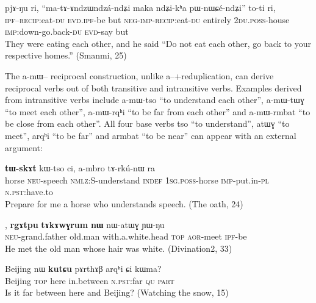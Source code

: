 \documentclass[oldfontcommands,oneside,a4paper,11pt]{memoir}
\newcommand{\ipa}[1]{{\phon #1}} %
\newcommand{\aor}{\textsc{aor}}
\newcommand{\du}{\textsc{du}}
\newcommand{\evd}{\textsc{evd}}
\newcommand{\imp}{\textsc{imp}}
\newcommand{\indef}{\textsc{indef}}
\newcommand{\ipf}{\textsc{ipf}}
\newcommand{\negat}{\textsc{neg}}
\newcommand{\neu}{\textsc{neu}}
\newcommand{\nmlz}{\textsc{nmlz}}
\newcommand{\npst}{\textsc{n.pst}}
\newcommand{\pl}{\textsc{pl}}
\newcommand{\poss}{\textsc{poss}}
\newcommand{\qu}{\textsc{qu}}
\newcommand{\recip}{\textsc{recip}}
\newcommand{\sg}{\textsc{sg}}
\newcommand{\topic}{\textsc{top}}
\begin{document}
\begin{exe}
\ex
\gll \ipa{cʰɯ-ɤndzɯndzá-ndʑi} 	\ipa{pjɤ-ŋu} 	\ipa{ri,} 	\ipa{``ma-tɤ-ɤndzɯndzá-ndʑi} \ipa{maka} \ipa{ndʑi-kʰa} \ipa{pɯ-nɯɕé-ndʑi''} 	\ipa{to-ti} 	\ipa{ri,}          \\
 \ipf{}--\recip{}:eat-\du{} \evd{}.\ipf{}-be but \negat{}-\imp{}-\recip{}:eat-\du{} entirely 2\du{}.\poss{}-house  \imp{}:down-go.back-\du{} \evd{}-say but \\
 \glt  They were eating each other, and he said ``Do not eat each other, go back to your respective homes.'' (Smanmi, 25)
\end{exe} 

 The \ipa{a-mɯ}-- reciprocal construction, unlike \ipa{a}--+reduplication, can derive reciprocal verbs out of both transitive and intransitive verbs. Examples derived from intransitive verbs include \ipa{a-mɯ-tso} ``to understand each other'',  \ipa{a-mɯ-tɯɣ} ``to meet each other'', \ipa{a-mɯ-rqʰi} ``to be far from each other'' and \ipa{a-mɯ-rmbat} ``to be close from each other''. All four base verbs \ipa{tso} ``to understand'', \ipa{atɯɣ} ``to meet'', \ipa{arqʰi} ``to be far'' and \ipa{armbat} ``to be near'' can appear with an external argument:
 
  
 \begin{exe}
\ex
\gll    	\ipa{mbro} \textbf{	\ipa{tɯ-skɤt}} 	\ipa{kɯ-tso} 	\ipa{ci,} 	\ipa{a-mbro} 	\ipa{tɤ-rkú-nɯ} 	\ipa{ra}   \\
  horse \neu{}-speech \nmlz{}:S-understand \indef{} 1\sg{}.\poss{}-horse \imp{}-put.in-\pl{} \npst{}:have.to\\
 \glt  Prepare for me a horse who understands speech.  (The oath, 24)
\end{exe} 
 
 \begin{exe}
\ex
\gll   \ipa{tɤ-wɯ}, \textbf{\ipa{rgɤtpu}} \textbf{\ipa{tɤkɤwɣrum} }	\textbf{\ipa{nɯ}} 	\ipa{nɯ-atɯɣ} 	\ipa{ɲɯ-ŋu}    \\
   \neu{}-grand.father old.man with.a.white.head  \topic{} \aor{}-meet \ipf{}-be \\
 \glt  He met the old man whose hair was white.  (Divination2, 33)
\end{exe} 
 
 \begin{exe}
\ex
\gll  Beijing 	\ipa{nɯ} \textbf{	\ipa{kutɕu}} 	\ipa{pɤrthɤβ} 	\ipa{arqʰi} 	\ipa{ɕi} 	\ipa{kɯma?} \\
Beijing \topic{} here in.between \npst{}:far \qu{} \textsc{part}  \\
 \glt Is it far between here and Beijing?   (Watching the snow, 15)
\end{exe}  
\end{document}
